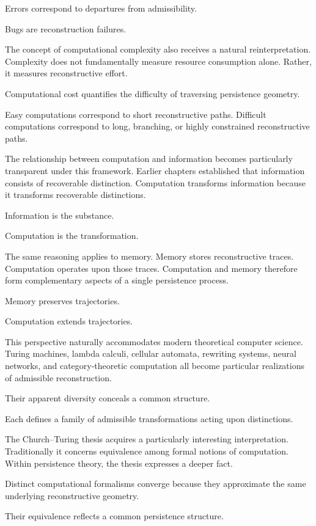 \documentclass[12pt,oneside]{article}
\theoremstyle{definition}
\begin{document}
Errors correspond to departures from admissibility.

Bugs are reconstruction failures.

The concept of computational complexity also receives a natural reinterpretation. Complexity does not fundamentally measure resource consumption alone. Rather, it measures reconstructive effort.

Computational cost quantifies the difficulty of traversing persistence geometry.

Easy computations correspond to short reconstructive paths. Difficult computations correspond to long, branching, or highly constrained reconstructive paths.

The relationship between computation and information becomes particularly transparent under this framework. Earlier chapters established that information consists of recoverable distinction. Computation transforms information because it transforms recoverable distinctions.

Information is the substance.

Computation is the transformation.

The same reasoning applies to memory. Memory stores reconstructive traces. Computation operates upon those traces. Computation and memory therefore form complementary aspects of a single persistence process.

Memory preserves trajectories.

Computation extends trajectories.

This perspective naturally accommodates modern theoretical computer science. Turing machines, lambda calculi, cellular automata, rewriting systems, neural networks, and category-theoretic computation all become particular realizations of admissible reconstruction.

Their apparent diversity conceals a common structure.

Each defines a family of admissible transformations acting upon distinctions.

The Church--Turing thesis acquires a particularly interesting interpretation. Traditionally it concerns equivalence among formal notions of computation. Within persistence theory, the thesis expresses a deeper fact.

Distinct computational formalisms converge because they approximate the same underlying reconstructive geometry.

Their equivalence reflects a common persistence structure.
\end{document}
